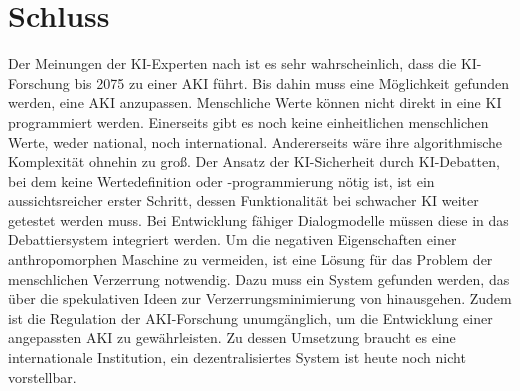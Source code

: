 \chapter{Schluss}
Der Meinungen der KI-Experten nach ist es sehr wahrscheinlich, dass die KI-Forschung bis 2075 zu einer AKI führt.  Bis dahin muss eine Möglichkeit gefunden werden, eine AKI anzupassen. Menschliche Werte können nicht direkt in eine KI programmiert werden. Einerseits gibt es noch keine einheitlichen menschlichen Werte, weder national, noch international. Andererseits wäre ihre algorithmische Komplexität ohnehin zu groß.  Der Ansatz der KI-Sicherheit durch KI-Debatten, bei dem keine Wertedefinition oder -programmierung nötig ist, ist ein aussichtsreicher erster Schritt, dessen Funktionalität bei schwacher KI weiter getestet werden muss. Bei Entwicklung fähiger Dialogmodelle müssen diese in das Debattiersystem integriert werden. Um die negativen Eigenschaften einer anthropomorphen Maschine zu vermeiden, ist eine Lösung für das Problem der menschlichen Verzerrung notwendig. Dazu muss ein System gefunden werden, das über die spekulativen Ideen zur Verzerrungsminimierung von \citeauthor{irving_ai_2018} hinausgehen. Zudem ist die Regulation der AKI-Forschung unumgänglich, um die Entwicklung einer angepassten AKI zu gewährleisten.  Zu dessen Umsetzung braucht es eine internationale Institution, ein dezentralisiertes System ist heute noch nicht vorstellbar. 
